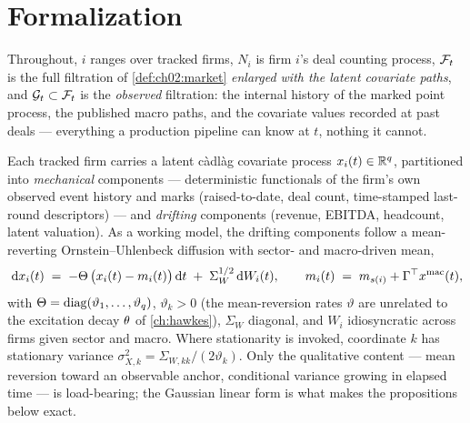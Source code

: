 \section{Formalization}\label{ch08:sec:formal}

Throughout, $i$ ranges over tracked firms, $N_i$ is firm $i$'s deal
counting process, $\mathcal{F}_{t}$ is the full filtration of
\cref{def:ch02:market} \emph{enlarged with the latent covariate paths},
and $\mathcal{G}_t \subset \mathcal{F}_{t}$ is the \emph{observed} filtration: the
internal history of the marked point process, the published macro paths,
and the covariate values recorded at past deals --- everything a
production pipeline can know at $t$, nothing it cannot.

\begin{assumption}\label{asm:ch08:latent}
Each tracked firm carries a latent c\`adl\`ag covariate process
$x_i(t) \in \mathbb{R}^{q}$, partitioned into \emph{mechanical} components ---
deterministic functionals of the firm's own observed event history and
marks (raised-to-date, deal count, time-stamped last-round descriptors)
--- and \emph{drifting} components (revenue, EBITDA, headcount, latent
valuation). As a working model, the drifting components follow a
mean-reverting Ornstein--Uhlenbeck diffusion \citep{uhlenbeck1930} with
sector- and macro-driven mean,
\begin{equation}\label{eq:ch08:ou}
\,\mathrm{d} x_i(t)
 \;=\;
 -\Theta\,\big(x_i(t) - m_i(t)\big)\,\mathrm{d} t
 \;+\; \Sigma_W^{1/2} \,\mathrm{d} W_i(t),
\qquad
 m_i(t) \;=\; m_{s(i)} + \Gamma^{\top} x^{\mathrm{mac}}(t),
\end{equation}
with $\Theta = \operatorname{diag}(\vartheta_1,\dots,\vartheta_q)$, $\vartheta_k > 0$
(the mean-reversion rates $\vartheta$ are unrelated to the excitation
decay $\theta$ of \cref{ch:hawkes}), $\Sigma_W$ diagonal, and $W_i$
idiosyncratic across firms given sector and macro. Where stationarity is
invoked, coordinate $k$ has stationary variance $\sigma_{X,k}^2 =
\Sigma_{W,kk}/(2\vartheta_k)$. Only the qualitative content --- mean
reversion toward an observable anchor, conditional variance growing in
elapsed time --- is load-bearing; the Gaussian linear form is what makes
the propositions below exact.
\end{assumption}

